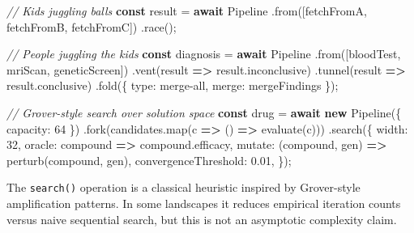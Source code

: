 \documentclass[
  11pt,
]{article}
\newenvironment{Shaded}{}{}
\newcommand{\AttributeTok}[1]{\textcolor[rgb]{0.49,0.56,0.16}{#1}}
\newcommand{\CommentTok}[1]{\textcolor[rgb]{0.38,0.63,0.69}{\textit{#1}}}
\newcommand{\ControlFlowTok}[1]{\textcolor[rgb]{0.00,0.44,0.13}{\textbf{#1}}}
\newcommand{\DecValTok}[1]{\textcolor[rgb]{0.25,0.63,0.44}{#1}}
\newcommand{\FloatTok}[1]{\textcolor[rgb]{0.25,0.63,0.44}{#1}}
\newcommand{\FunctionTok}[1]{\textcolor[rgb]{0.02,0.16,0.49}{#1}}
\newcommand{\KeywordTok}[1]{\textcolor[rgb]{0.00,0.44,0.13}{\textbf{#1}}}
\newcommand{\NormalTok}[1]{#1}
\newcommand{\OperatorTok}[1]{\textcolor[rgb]{0.40,0.40,0.40}{#1}}
\newcommand{\StringTok}[1]{\textcolor[rgb]{0.25,0.44,0.63}{#1}}
\begin{document}
\begin{Shaded}
\begin{Highlighting}[]
\CommentTok{// Kids juggling balls}
\KeywordTok{const}\NormalTok{ result }\OperatorTok{=} \ControlFlowTok{await}\NormalTok{ Pipeline}
  \OperatorTok{.}\FunctionTok{from}\NormalTok{([fetchFromA}\OperatorTok{,}\NormalTok{ fetchFromB}\OperatorTok{,}\NormalTok{ fetchFromC])}
  \OperatorTok{.}\FunctionTok{race}\NormalTok{()}\OperatorTok{;}

\CommentTok{// People juggling the kids}
\KeywordTok{const}\NormalTok{ diagnosis }\OperatorTok{=} \ControlFlowTok{await}\NormalTok{ Pipeline}
  \OperatorTok{.}\FunctionTok{from}\NormalTok{([bloodTest}\OperatorTok{,}\NormalTok{ mriScan}\OperatorTok{,}\NormalTok{ geneticScreen])}
  \OperatorTok{.}\FunctionTok{vent}\NormalTok{(result }\KeywordTok{=\textgreater{}}\NormalTok{ result}\OperatorTok{.}\AttributeTok{inconclusive}\NormalTok{)}
  \OperatorTok{.}\FunctionTok{tunnel}\NormalTok{(result }\KeywordTok{=\textgreater{}}\NormalTok{ result}\OperatorTok{.}\AttributeTok{conclusive}\NormalTok{)}
  \OperatorTok{.}\FunctionTok{fold}\NormalTok{(\{ type}\OperatorTok{:} \StringTok{\textquotesingle{}merge{-}all\textquotesingle{}}\OperatorTok{,}\NormalTok{ merge}\OperatorTok{:}\NormalTok{ mergeFindings \})}\OperatorTok{;}

\CommentTok{// Grover{-}style search over solution space}
\KeywordTok{const}\NormalTok{ drug }\OperatorTok{=} \ControlFlowTok{await} \KeywordTok{new} \FunctionTok{Pipeline}\NormalTok{(\{ capacity}\OperatorTok{:} \DecValTok{64}\NormalTok{ \})}
  \OperatorTok{.}\FunctionTok{fork}\NormalTok{(candidates}\OperatorTok{.}\FunctionTok{map}\NormalTok{(c }\KeywordTok{=\textgreater{}}\NormalTok{ () }\KeywordTok{=\textgreater{}} \FunctionTok{evaluate}\NormalTok{(c)))}
  \OperatorTok{.}\FunctionTok{search}\NormalTok{(\{}
\NormalTok{    width}\OperatorTok{:} \DecValTok{32}\OperatorTok{,}
\NormalTok{    oracle}\OperatorTok{:}\NormalTok{ compound }\KeywordTok{=\textgreater{}}\NormalTok{ compound}\OperatorTok{.}\AttributeTok{efficacy}\OperatorTok{,}
\NormalTok{    mutate}\OperatorTok{:}\NormalTok{ (compound}\OperatorTok{,}\NormalTok{ gen) }\KeywordTok{=\textgreater{}} \FunctionTok{perturb}\NormalTok{(compound}\OperatorTok{,}\NormalTok{ gen)}\OperatorTok{,}
\NormalTok{    convergenceThreshold}\OperatorTok{:} \FloatTok{0.01}\OperatorTok{,}
\NormalTok{  \})}\OperatorTok{;}
\end{Highlighting}
\end{Shaded}

The \texttt{search()} operation is a classical heuristic inspired by
Grover-style amplification patterns. In some landscapes it reduces
empirical iteration counts versus naive sequential search, but this is
not an asymptotic complexity claim.
\end{document}
